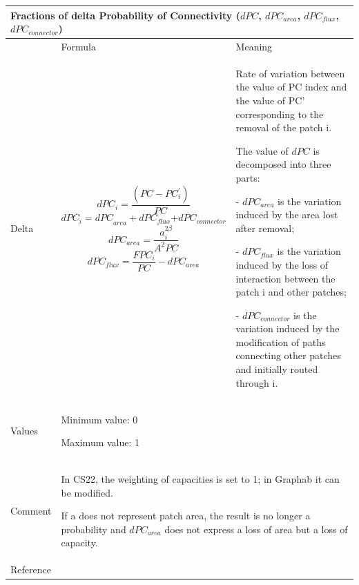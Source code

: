 \documentclass{article}
\begin{document}
\begin{table}[H]
\begin{tabular}{|m{2.4919999cm}|m{5.229cm}m{7.924cm}|}
\hline
\multicolumn{3}{|m{16.044998cm}|}{Fractions of delta Probability of
Connectivity ($dPC$, $dPC_{area}$, $dPC_{flux}$, $dPC_{connector}$)}\\\hline
 &
\multicolumn{1}{m{5.229cm}|}{Formula} &
Meaning\\\hline
Delta &
\multicolumn{1}{m{5.229cm}|}{\begin{equation*}
{\mathit{dPC}}_{i}=\frac{(\mathit{PC}-{\mathit{PC}}_{i}^{'})}{\mathit{PC}}
\end{equation*}
\begin{equation*}
{{\mathit{dPC}}_{i}=\mathit{dPC}}_{\mathit{area}}+{\mathit{dPC}}_{\mathit{flux}}{+\mathit{dPC}}_{\mathit{connector}}
\end{equation*}
\begin{equation*}
{\mathit{dPC}}_{\mathit{area}}=\frac{{a}_{i}^{2\beta
}}{{A}^{2}\mathit{PC}}
\end{equation*}
\begin{equation*}
{dPC}_{flux}=\frac{{FPC}_{i}}{PC}-{dPC}_{area}
\end{equation*}
} &
Rate of variation between the value of PC index and the value of PC’
corresponding to the removal of the patch i.

The value of $dPC$ is decomposed into three parts:

{}- $dPC_{area}$ is the variation induced by the area lost after removal;

{}- $dPC_{flux}$ is the variation induced by the loss of interaction between
the patch i and other patches;

{}- $dPC_{connector}$ is the variation induced by the modification of paths
connecting other patches and initially routed through i.~\\\hline
Values &
\multicolumn{2}{m{13.353cm}|}{
Minimum value: 0

Maximum value: 1
}\\\hline
Comment &
\multicolumn{2}{m{13.353cm}|}{In CS22, the weighting of capacities is
set to 1; in Graphab it can be modified. 

If a does not represent patch area, the result is no longer a
probability and $dPC_{area}$ does not express a loss of area but a loss of
capacity.

}\\\hline
Reference &
\multicolumn{2}{m{13.353cm}|}{\cite{Saura2010}}\\\hline
\end{tabular}
\end{table}
\end{document}
